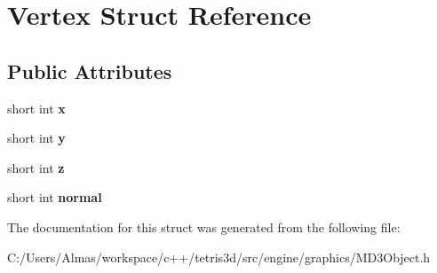 \hypertarget{struct_vertex}{\section{Vertex Struct Reference}
\label{struct_vertex}
}
\subsection*{Public Attributes}
\begin{DoxyCompactItemize}
\item 
\hypertarget{struct_vertex_ae51bec66f83ba2acda8b33c6a04f0843}{short int {\bfseries x}}\label{struct_vertex_ae51bec66f83ba2acda8b33c6a04f0843}

\item 
\hypertarget{struct_vertex_aa9688ea017f58a3c6b5559a09fe528ea}{short int {\bfseries y}}\label{struct_vertex_aa9688ea017f58a3c6b5559a09fe528ea}

\item 
\hypertarget{struct_vertex_abf9cbcfc886d24db3a851d37922712e3}{short int {\bfseries z}}\label{struct_vertex_abf9cbcfc886d24db3a851d37922712e3}

\item 
\hypertarget{struct_vertex_ab27852969f5783e4ed624ed543a15d03}{short int {\bfseries normal}}\label{struct_vertex_ab27852969f5783e4ed624ed543a15d03}

\end{DoxyCompactItemize}


The documentation for this struct was generated from the following file\-:\begin{DoxyCompactItemize}
\item 
C\-:/\-Users/\-Almas/workspace/c++/tetris3d/src/engine/graphics/M\-D3\-Object.\-h\end{DoxyCompactItemize}
